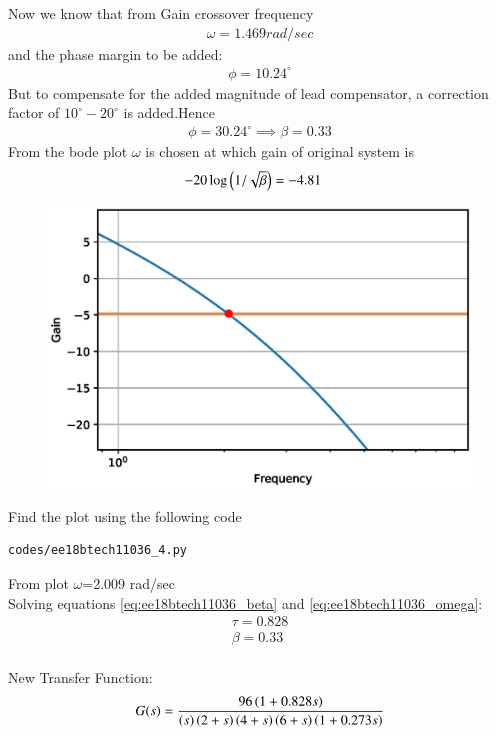 \begin{enumerate}[label=\thesection.\arabic*.,ref=\thesection.\theenumi]
Now we know that from Gain crossover frequency
\begin{align}
\omega =1.469 rad/sec
\end{align}
and the phase margin to be added:
\begin{align}
\phi =10.24^{\circ}
\end{align}
But to compensate for the added magnitude of lead compensator, a correction factor of $10^{\circ}-20^{\circ}$
is added.Hence
\begin{align}
\phi =30.24^{\circ}
\implies \beta=0.33
\end{align}
From the bode plot $\omega$ is chosen at which gain of original system is
\begin{align}
-20\log\left(1/\sqrt{\beta}\right)&=-4.81
\end{align}
\begin{figure}[!h]
  \centering
  \includegraphics[width=\columnwidth]{./figs/ee18btech11036_3.eps}
  \caption{}
  \label{fig:ee18btech11036_3}
\end{figure}
Find the plot using the following code
\begin{lstlisting}
codes/ee18btech11036_4.py
\end{lstlisting}
From plot $\omega$=2.009 rad/sec\\
Solving equations \ref{eq:ee18btech11036_beta} and \ref{eq:ee18btech11036_omega}:
\begin{align}
\tau= 0.828\\
\beta=0.33\\
\label{eq:ee18btech11036_final}
\end{align}

New Transfer Function:
\begin{align}
G(s)=\frac{96\left(1+ 0.828s\right)}{\left(s\right)\left(2+s\right)\left(4+s\right)\left(6+s\right)\left(1+0.273s\right)}
\end{align}



\end{enumerate}

